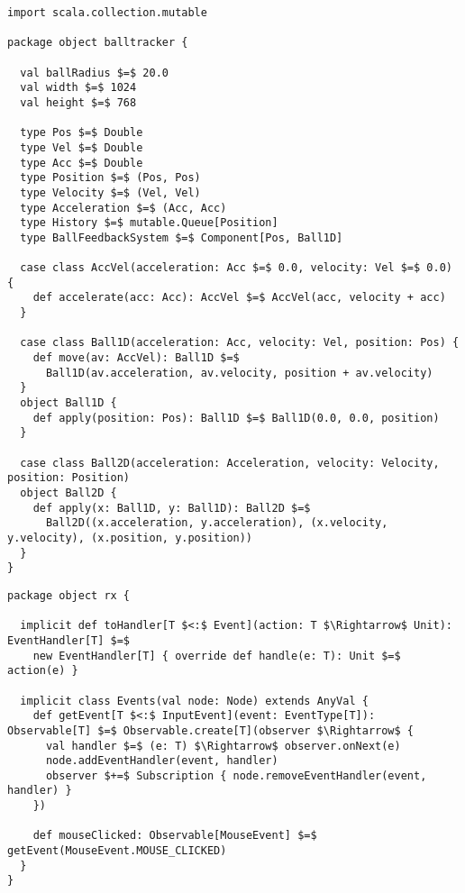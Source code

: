 \begin{minipage}{\linewidth}
\begin{lstlisting}[style=ScalaStyle, caption={Ball movement control}, label={lst:ball-full-utils-reactive}]
import scala.collection.mutable

package object balltracker {

  val ballRadius $=$ 20.0
  val width $=$ 1024
  val height $=$ 768

  type Pos $=$ Double
  type Vel $=$ Double
  type Acc $=$ Double
  type Position $=$ (Pos, Pos)
  type Velocity $=$ (Vel, Vel)
  type Acceleration $=$ (Acc, Acc)
  type History $=$ mutable.Queue[Position]
  type BallFeedbackSystem $=$ Component[Pos, Ball1D]

  case class AccVel(acceleration: Acc $=$ 0.0, velocity: Vel $=$ 0.0) {
    def accelerate(acc: Acc): AccVel $=$ AccVel(acc, velocity + acc)
  }

  case class Ball1D(acceleration: Acc, velocity: Vel, position: Pos) {
    def move(av: AccVel): Ball1D $=$
      Ball1D(av.acceleration, av.velocity, position + av.velocity)
  }
  object Ball1D {
    def apply(position: Pos): Ball1D $=$ Ball1D(0.0, 0.0, position)
  }

  case class Ball2D(acceleration: Acceleration, velocity: Velocity, position: Position)
  object Ball2D {
    def apply(x: Ball1D, y: Ball1D): Ball2D $=$
      Ball2D((x.acceleration, y.acceleration), (x.velocity, y.velocity), (x.position, y.position))
  }
}
\end{lstlisting}
\end{minipage}

\begin{minipage}{\linewidth}
\begin{lstlisting}[style=ScalaStyle, caption={JavaFx/Rx interface}, label={lst:ball-full-rx-reactive}]
package object rx {

  implicit def toHandler[T $<:$ Event](action: T $\Rightarrow$ Unit): EventHandler[T] $=$
    new EventHandler[T] { override def handle(e: T): Unit $=$ action(e) }

  implicit class Events(val node: Node) extends AnyVal {
    def getEvent[T $<:$ InputEvent](event: EventType[T]): Observable[T] $=$ Observable.create[T](observer $\Rightarrow$ {
      val handler $=$ (e: T) $\Rightarrow$ observer.onNext(e)
      node.addEventHandler(event, handler)
      observer $+=$ Subscription { node.removeEventHandler(event, handler) }
    })

    def mouseClicked: Observable[MouseEvent] $=$ getEvent(MouseEvent.MOUSE_CLICKED)
  }
}
\end{lstlisting}
\end{minipage}
